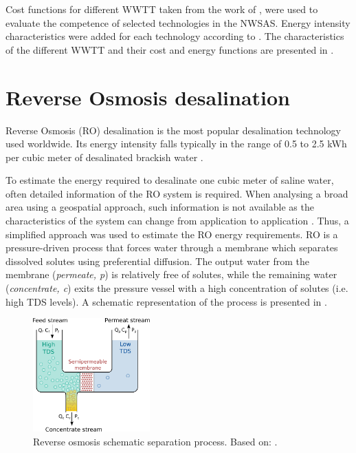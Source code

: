 \documentclass[12pt]{iopart}
\begin{document}
Cost functions for different WWTT taken from the work of \citet{Assessmentwastewatertreatment2012}, were used to evaluate the competence of selected technologies in the NWSAS. Energy intensity characteristics were added for each technology according to \cite{Energypatternanalysis2012,ComparativeAnalysisEnergy2017}. The characteristics of the different WWTT and their cost and energy functions are presented in .



\section{Reverse Osmosis desalination}\label{Sc:RO}
Reverse Osmosis (RO) desalination is the most popular desalination technology used worldwide. Its energy intensity falls typically in the range of 0.5 to 2.5 kWh per cubic meter of desalinated brackish water \cite{Energyoptimalgroundwater2013,karabelasAnalysisSpecificEnergy2018a,panBrackishWaterDesalination2020}.

To estimate the energy required to desalinate one cubic meter of saline water, often detailed information of the RO system is required. When analysing a broad area using a geospatial approach, such information is not available as the characteristics of the system can change from application to application \cite{stillwellPredictingSpecificEnergy2016,aminfardMultilayeredSpatialMethodology2019}. Thus, a simplified approach was used to estimate the RO energy requirements. RO is a pressure-driven process that forces water through a membrane which separates dissolved solutes using preferential diffusion. The output water from the membrane (\textit{permeate, p}) is relatively free of solutes, while the remaining water (\textit{concentrate, c}) exits the pressure vessel with a high concentration of solutes (i.e. high TDS levels). A schematic representation of the process is presented in  \cite{crittenden_mwhs_2012}.

\begin{figure}[!h]
	\centering
	\includegraphics[width=0.4\textwidth]{Reverse_Osmosis}
	\caption[Reverse Osmosis schematic separation process]{Reverse osmosis schematic separation process. Based on: \cite{crittenden_mwhs_2012}.}
	\label{fig:ro}
\end{figure} 
\end{document}
